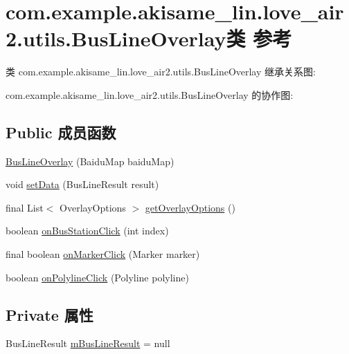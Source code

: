 \hypertarget{classcom_1_1example_1_1akisame__lin_1_1love__air2_1_1utils_1_1_bus_line_overlay}{}\section{com.\+example.\+akisame\+\_\+lin.\+love\+\_\+air2.\+utils.\+Bus\+Line\+Overlay类 参考}
\label{classcom_1_1example_1_1akisame__lin_1_1love__air2_1_1utils_1_1_bus_line_overlay}


类 com.\+example.\+akisame\+\_\+lin.\+love\+\_\+air2.\+utils.\+Bus\+Line\+Overlay 继承关系图\+:


com.\+example.\+akisame\+\_\+lin.\+love\+\_\+air2.\+utils.\+Bus\+Line\+Overlay 的协作图\+:
\subsection*{Public 成员函数}
\begin{DoxyCompactItemize}
\item 
\mbox{\hyperlink{classcom_1_1example_1_1akisame__lin_1_1love__air2_1_1utils_1_1_bus_line_overlay_a3bae762afd7f6ab438e947096aa3a412}{Bus\+Line\+Overlay}} (Baidu\+Map baidu\+Map)
\item 
void \mbox{\hyperlink{classcom_1_1example_1_1akisame__lin_1_1love__air2_1_1utils_1_1_bus_line_overlay_a170ae0fce2e4d5d17d066ecf0ebff773}{set\+Data}} (Bus\+Line\+Result result)
\item 
final List$<$ Overlay\+Options $>$ \mbox{\hyperlink{classcom_1_1example_1_1akisame__lin_1_1love__air2_1_1utils_1_1_bus_line_overlay_abffcfad4dbf8428fa7a009f4129121a9}{get\+Overlay\+Options}} ()
\item 
boolean \mbox{\hyperlink{classcom_1_1example_1_1akisame__lin_1_1love__air2_1_1utils_1_1_bus_line_overlay_aa4a33d7e17c716831a6f49b1a668b093}{on\+Bus\+Station\+Click}} (int index)
\item 
final boolean \mbox{\hyperlink{classcom_1_1example_1_1akisame__lin_1_1love__air2_1_1utils_1_1_bus_line_overlay_afa098f2a4e0fea56e427e86ba77db592}{on\+Marker\+Click}} (Marker marker)
\item 
boolean \mbox{\hyperlink{classcom_1_1example_1_1akisame__lin_1_1love__air2_1_1utils_1_1_bus_line_overlay_a3670408552eea15f9a7e2939995b736a}{on\+Polyline\+Click}} (Polyline polyline)
\end{DoxyCompactItemize}
\subsection*{Private 属性}
\begin{DoxyCompactItemize}
\item 
Bus\+Line\+Result \mbox{\hyperlink{classcom_1_1example_1_1akisame__lin_1_1love__air2_1_1utils_1_1_bus_line_overlay_a323eb1d31b4b75b16dad16e83c3a4029}{m\+Bus\+Line\+Result}} = null
\end{DoxyCompactItemize}
